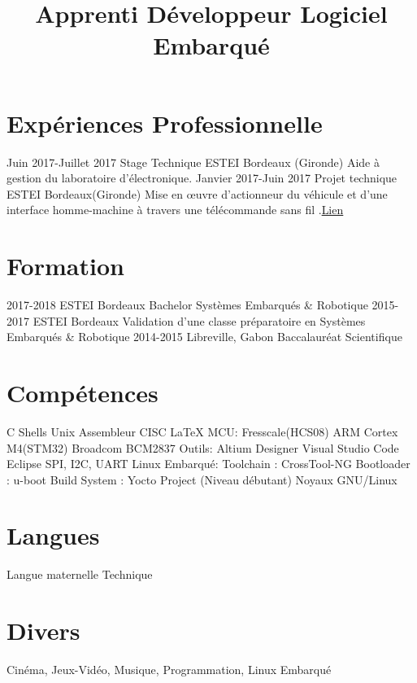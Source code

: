 \documentclass[10pts,a4paper,sans]{moderncv}
\title{Apprenti D\'{e}veloppeur Logiciel Embarqu\'{e}}
\begin{document}
\maketitle

\section{Exp\'{e}riences Professionnelle}
\cventry{} {Juin 2017-Juillet 2017} {Stage Technique} {ESTEI} {Bordeaux (Gironde)} {Aide à gestion du laboratoire d’électronique.} {}
\cventry{} {Janvier 2017-Juin 2017} {Projet technique} {ESTEI} {Bordeaux(Gironde)} {Mise en œuvre d'actionneur du véhicule et d'une interface homme-machine à travers une télécommande sans fil .\href{https://github.com/jorisoffouga/projet_vehicule_interactif_B2}{Lien}}
{} {}

\section{Formation}
\cventry{} {2017-2018} {ESTEI} {Bordeaux} {Bachelor Systèmes Embarqués \& Robotique} {}
\cventry{} {2015-2017} {ESTEI} {Bordeaux} {Validation d'une classe préparatoire en Systèmes Embarqués \& Robotique} {}
\cventry{} {2014-2015} {Libreville, Gabon} {Baccalauréat Scientifique} {} {}

\section{Compétences}
 {C \newline {} Shells Unix \newline {} Assembleur CISC \newline {} \LaTeX} {MCU:} {Fresscale(HCS08) \newline {} ARM Cortex M4(STM32)}
 {Broadcom BCM2837} {Outils:} {Altium Designer \newline {} Visual Studio Code \newline {} Eclipse}
 {SPI, I2C, UART} {Linux Embarqu\'{e}:}{ 
	Toolchain : CrossTool-NG
	\newline {} Bootloader : u-boot
	\newline {} Build System : Yocto Project (Niveau débutant)
	\newline {} Noyaux GNU/Linux
}

\section{Langues}
 {Langue maternelle}
 {Technique}
 
\newpage
\section{Divers}
 {Cinéma, Jeux-Vidéo, Musique, Programmation, Linux Embarqué}
\end{document}
